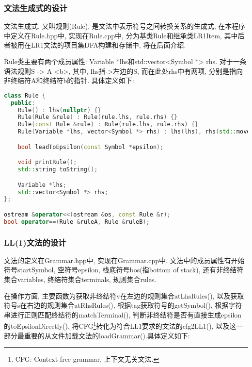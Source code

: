 \subsubsection{文法生成式的设计}
文法生成式, 又叫规则(Rule), 是文法中表示符号之间转换关系的生成式,
在本程序中定义在Rule.hpp中, 实现在Rule.cpp中, 分为基类Rule和继承类LR1Item,
其中后者被用在LR1文法的项目集DFA构建和存储中, 将在后面介绍.\par

Rule类主要有两个成员属性: Variable *lhs和std::vector<Symbol *> rhs.
对于一条语法规则S -> A <b>, 其中, lhs指->左边的S, 而在此处rhs中有两项,
分别是指向非终结符A和终结符b的指针. 具体定义如下:

\begin{lstlisting}[language=c++]
class Rule {
  public:
    Rule() : lhs(nullptr) {}
    Rule(Rule &rule) : Rule(rule.lhs, rule.rhs) {}
    Rule(const Rule &rule) : Rule(rule.lhs, rule.rhs) {}
    Rule(Variable *lhs, vector<Symbol *> rhs) : lhs(lhs), rhs(std::move(rhs)) {}

    bool leadToEpsilon(const Symbol *epsilon);

    void printRule();
    std::string toString();

    Variable *lhs;
    std::vector<Symbol *> rhs;
};

ostream &operator<<(ostream &os, const Rule &r);
bool operator==(Rule &ruleA, Rule &ruleB);
\end{lstlisting}

\subsubsection{LL(1)文法的设计}
文法的定义在Grammar.hpp中, 实现在Grammar.cpp中.
文法中的成员属性有开始符号startSymbol, 空符号epsilon, 栈底符号bos(指bottom of
stack), 还有非终结符集合variables, 终结符集合terminals, 规则集合rules.\par

在操作方面, 主要函数为获取非终结符v在左边的规则集合atLhsRules(),
以及获取符号s在右边的规则集合atRhsRules(), 根据tag获取符号的getSymbol(),
根据字符串进行正则匹配终结符的matchTerminal(),
判断非终结符是否有直接生成epsilon的toEpsilonDirectly(), 将CFG\footnote{CFG:
	Context free grammar, 上下文无关文法.}转化为符合LL1要求的文法的cfg2LL1(),
以及这一部分最重要的从文件加载文法的loadGrammar().具体定义如下:

